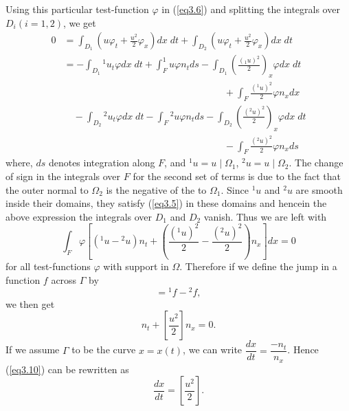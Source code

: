 Using this particular test-function $\varphi$ in (\ref{eq3.6}) and splitting
the integrals over $D_i(i=1,2)$, we get
\begin{align*}
0 & = \int_{D_1} \left(u\varphi_t + \frac{u^2}{2}\varphi_x\right) dx \; dt +
\int_{D_2} \left(u\varphi_t + \frac{u^2}{2}\varphi_x\right) dx \; dt\\
& = -\int_{D_1} {}^1 u_t \varphi dx \; dt + \int^{1}_F u \varphi n_t
ds - \int_{D_1} \left(\frac{({}_1 u)^2}{2}\right)_x \varphi dx\; dt\\ 
& \hspace{7cm} + \int_F \frac{({}^1 u)^2}{2} \varphi n_x dx\\
& \quad - \int_{D_2} {}^2 u_t \varphi dx \; dt - \int_F {}^2 u \varphi
n_t ds - \int_{D_2} \left(\frac{({}^2u)^2}{2}\right)_x \varphi dx \;
dt\\ 
& \hspace{7cm} - \int_F \frac{({}^2 u)^2}{2}  \varphi n_x ds
\end{align*}
where, $ds$ denotes integration along $F$, and ${}^1 u = u \mid
\Omega_1$, ${}^2 u = u\mid \Omega_2$. The change of sign in the
integrals over $F$ for the second set of terms is due to the fact that
the outer normal to $\Omega_2$ is the negative of the to
$\Omega_1$. Since ${}^1u$ and ${}^2u$ are smooth inside their domains,
they satisfy (\ref{eq3.5}) in these domains and hence\pageoriginale in the
above expression the integrals over $D_1$ and $D_2$ vanish. Thus we
are left with 
\begin{equation*}
\int_F \varphi \left[ ({}^1 u- {}^2 u) n_t + \left(\frac{({}^1u)^2}{2} -
  \frac{({}^2 u)^2}{2}\right) n_x\right] dx = 0 \tag{3.8}\label{eq3.8}
\end{equation*}
for all test-functions $\varphi$ with support in $\Omega$. Therefore
if we define the jump in a function $f$ across $\Gamma$ by
\begin{equation*}
[f] = {}^1 f - {}^2 f,
\tag{3.9}\label{eq3.9}
\end{equation*}
we then get
\begin{equation*}
[u] n_t + \left[\frac{u^2}{2}\right] n_x = 0. \tag{3.10}\label{eq3.10}
\end{equation*}
If we assume $\Gamma$ to be the curve $x = x(t)$, we can write
$\dfrac{dx}{dt} = \dfrac{-n_t}{n_x}$. Hence (\ref{eq3.10}) can be rewritten as 
\begin{equation*}
[u] \frac{dx}{dt} = \left[\frac{u^2}{2}\right].\tag{3.11}\label{eq3.11}
\end{equation*}

